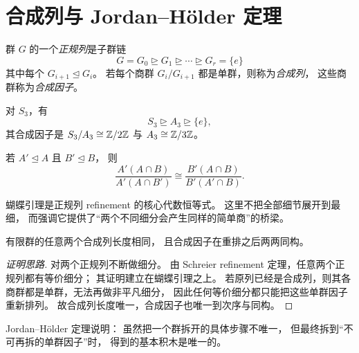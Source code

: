 \section{合成列与 Jordan--H\"older 定理}
\begin{definition}
群 $G$ 的一个\emph{正规列}是子群链
\[
G=G_0\trianglerighteq G_1\trianglerighteq\cdots\trianglerighteq G_r=\{e\}
\]
其中每个 $G_{i+1}\trianglelefteq G_i$。
若每个商群 $G_i/G_{i+1}$ 都是单群，则称为\emph{合成列}，
这些商群称为\emph{合成因子}。
\end{definition}
\begin{example}
对 $S_3$，有
\[
S_3\trianglerighteq A_3\trianglerighteq \{e\},
\]
其合成因子是 $S_3/A_3\cong \mathbb{Z}/2\mathbb{Z}$ 与 $A_3\cong \mathbb{Z}/3\mathbb{Z}$。
\end{example}
\begin{lemma}
若 $A'\trianglelefteq A$ 且 $B'\trianglelefteq B$，
则
\[
\frac{A'(A\cap B)}{A'(A\cap B')}
\cong
\frac{B'(A\cap B)}{B'(A'\cap B)}.
\]
\end{lemma}
\begin{remark}
蝴蝶引理是正规列 refinement 的核心代数恒等式。
这里不把全部细节展开到最细，
而强调它提供了“两个不同细分会产生同样的简单商”的桥梁。
\end{remark}
\begin{theorem}
有限群的任意两个合成列长度相同，
且合成因子在重排之后两两同构。
\end{theorem}
\begin{proof}[证明思路]
对两个正规列不断做细分。
由 Schreier refinement 定理，任意两个正规列都有等价细分；
其证明建立在蝴蝶引理之上。
若原列已经是合成列，则其各商群都是单群，无法再做非平凡细分，
因此任何等价细分都只能把这些单群因子重新排列。
故合成列长度唯一，合成因子也唯一到次序与同构。
\end{proof}
\begin{remark}
Jordan--H\"older 定理说明：
虽然把一个群拆开的具体步骤不唯一，
但最终拆到“不可再拆的单群因子”时，
得到的基本积木是唯一的。
\end{remark}
